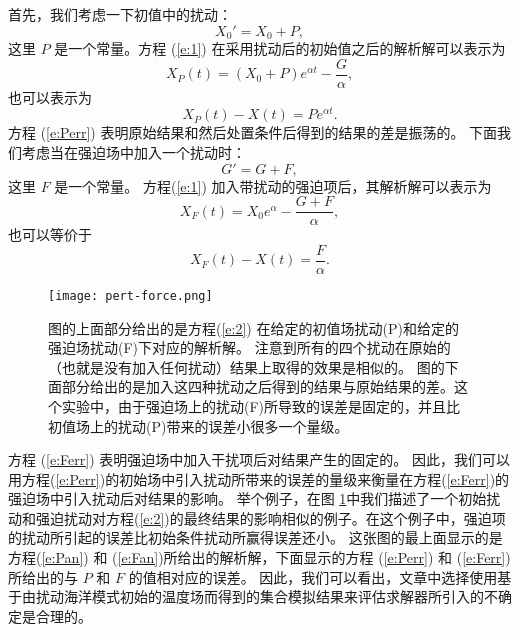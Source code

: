  
首先，我们考虑一下初值中的扰动：
\begin{equation*}
X_0' =X_0+P,
\end{equation*}
这里 $P$ 是一个常量。方程 (\ref{e:1}) 在采用扰动后的初始值之后的解析解可以表示为 
\begin{equation}
X_P(t) = (X_0+P)e^{\alpha t } -\frac{G}{\alpha}, 
\label{e:Pan}
\end{equation}
也可以表示为
\begin{equation}
X_P(t)-X(t) = Pe^{\alpha t }.
\label{e:Perr}
\end{equation}
方程 (\ref{e:Perr}) 表明原始结果和然后处置条件后得到的结果的差是振荡的。
下面我们考虑当在强迫场中加入一个扰动时： 
\begin{equation*}
G' = G + F,
\end{equation*}
这里 $F$ 是一个常量。  方程(\ref{e:1}) 加入带扰动的强迫项后，其解析解可以表示为
\begin{equation}
X_F(t) = X_0e^{\alpha } -\frac{G+F}{\alpha},
\label{e:Fan}
\end{equation}
也可以等价于
\begin{equation}
X_F(t)-X(t) = \frac{F}{\alpha}. 
\label{e:Ferr}
\end{equation}

\begin {figure} 
\centering
\texttt{[image: pert-force.png]}
\caption{ 图的上面部分给出的是方程(\ref{e:2}) 在给定的初值场扰动(P)和给定的强迫场扰动(F)下对应的解析解。
注意到所有的四个扰动在原始的（也就是没有加入任何扰动）结果上取得的效果是相似的。 图的下面部分给出的是加入这四种扰动之后得到的结果与原始结果的差。这个实验中，由于强迫场上的扰动(F)所导致的误差是固定的，并且比初值场上的扰动(P)带来的误差小很多一个量级。}
\label {fig:1Danalytical}
\end {figure}

方程 (\ref{e:Ferr}) 表明强迫场中加入干扰项后对结果产生的固定的。
因此，我们可以用方程(\ref{e:Perr})的初始场中引入扰动所带来的误差的量级来衡量在方程(\ref{e:Ferr})的强迫场中引入扰动后对结果的影响。 
举个例子，在图  \ref{fig:1Danalytical}中我们描述了一个初始扰动和强迫扰动对方程(\ref{e:2})的最终结果的影响相似的例子。在这个例子中，强迫项的扰动所引起的误差比初始条件扰动所赢得误差还小。
这张图的最上面显示的是方程(\ref{e:Pan}) 和 (\ref{e:Fan})所给出的解析解，下面显示的方程 (\ref{e:Perr}) 和 (\ref{e:Ferr}) 所给出的与 $P$ 和 $F$ 的值相对应的误差。 
因此，我们可以看出，文章中选择使用基于由扰动海洋模式初始的温度场而得到的集合模拟结果来评估求解器所引入的不确定是合理的。


